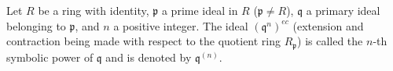 Let $R$ be a ring with identity, $\mathfrak{p}$ a prime ideal in $R$ ($\mathfrak{p} \neq R$), $\mathfrak{q}$ a primary ideal belonging to $\mathfrak{p}$, and $n$ a positive integer. The ideal $(\mathfrak{q}^n)^{ec}$ (extension and contraction being made with respect to the quotient ring $R_{\mathfrak{p}}$) is called the $n$-th symbolic power of $\mathfrak{q}$ and is denoted by $\mathfrak{q}^{(n)}$.
